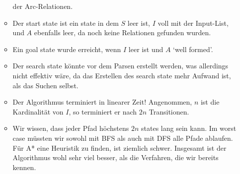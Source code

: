 \documentclass[12pt,a4paper]{article}
\begin{document}
\begin{itemize}
\begin{itemize}
                der Arc-Relationen.
            \item Der start state ist ein state in dem $S$ leer ist, $I$ voll
                mit der Input-List, und $A$ ebenfalls leer, da noch keine
                Relationen gefunden wurden.
            \item Ein goal state wurde erreicht, wenn $I$ leer ist und $A$
                `well formed'.
            \item Der search state könnte vor dem Parsen erstellt werden,
                was allerdings nicht effektiv wäre, da das Erstellen
                des search state mehr Aufwand ist, als das Suchen selbst.
            \item Der Algorithmus terminiert in linearer Zeit! Angenommen,
                $n$ ist die Kardinalität von $I$, so terminiert er nach
                $2n$ Transitionen.
            \item Wir wissen, dass jeder Pfad höchstens $2n$ states lang sein kann.
                Im worst case müssten wir sowohl mit BFS als auch mit DFS
                alle Pfade ablaufen.
                Für A* eine Heuristik zu finden, ist ziemlich schwer.
                Insgesamt ist der Algorithmus wohl sehr viel besser,
                als die Verfahren, die wir bereits kennen.
        \end{itemize}
\end{itemize}
\end{document}

